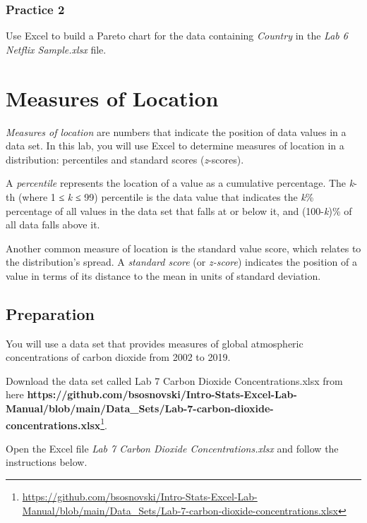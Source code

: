 \documentclass[
  12pt,
  letterpaper,
]{book}
\DeclareRobustCommand{\href}[2]{#2\footnote{\url{#1}}}
\begin{document}
\hypertarget{practice-2-4}{%
\subsection{Practice 2}\label{practice-2-4}}

Use Excel to build a Pareto chart for the data containing \emph{Country} in the \emph{Lab 6 Netflix Sample.xlsx} file.

\hypertarget{measures-of-location}{%
\chapter{Measures of Location}\label{measures-of-location}}

\emph{Measures of location} are numbers that indicate the position of data values in a data set. In this lab, you will use Excel to determine measures of location in a distribution: percentiles and standard scores (\emph{z}-scores).

A \emph{percentile} represents the location of a value as a cumulative percentage. The \emph{k}-th (where 1 ≤ \emph{k} ≤ 99) percentile is the data value that indicates the \emph{k}\% percentage of all values in the data set that falls at or below it, and (100-\emph{k})\% of all data falls above it.

Another common measure of location is the standard value score, which relates to the distribution's spread. A \emph{standard score} (or \emph{z-score}) indicates the position of a value in terms of its distance to the mean in units of standard deviation.

\hypertarget{preparation-4}{%
\section{Preparation}\label{preparation-4}}

You will use a data set that provides measures of global atmospheric concentrations of carbon dioxide from 2002 to 2019.

Download the data set called Lab 7 Carbon Dioxide Concentrations.xlsx from here \href{https://github.com/bsosnovski/Intro-Stats-Excel-Lab-Manual/blob/main/Data_Sets/Lab-7-carbon-dioxide-concentrations.xlsx}{\textbf{https://github.com/bsosnovski/Intro-Stats-Excel-Lab-Manual/blob/main/Data\_Sets/Lab-7-carbon-dioxide-concentrations.xlsx}}.

Open the Excel file \emph{Lab 7 Carbon Dioxide Concentrations.xlsx} and follow the instructions below.
\end{document}
